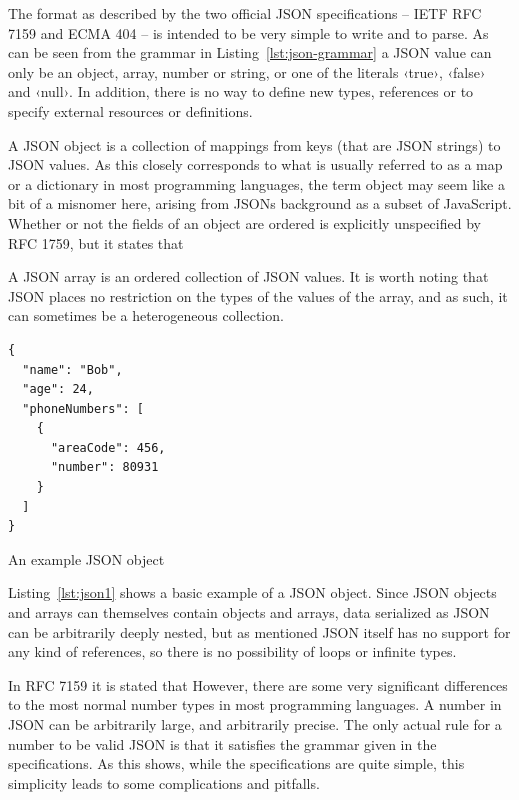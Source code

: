 The format as described by the two official JSON specifications -- IETF RFC 7159 \cite{RFC7159} and ECMA 404 \cite{ECMA404} -- is intended to be very simple to write and to parse. As can be seen from the grammar in Listing~\ref{lst:json-grammar} a JSON value can only be an object, array, number or string, or one of the literals ‹true›, ‹false› and ‹null›. In addition, there is no way to define new types, references or to specify external resources or definitions.

A JSON object is a collection of mappings from keys (that are JSON strings) to JSON values. As this closely corresponds to what is usually referred to as a map or a dictionary in most programming languages, the term object may seem like a bit of a misnomer here, arising from JSONs background as a subset of JavaScript. Whether or not the fields of an object are ordered is explicitly unspecified by RFC 1759, but it states  \cite[6]{RFC7159} that 

A JSON array is an ordered collection of JSON values. It is worth noting that JSON places no restriction on the types of the values of the array, and as such, it can sometimes be a heterogeneous collection.

\begin{listing}[ht!]
\begin{verbatim}
{
  "name": "Bob",
  "age": 24,
  "phoneNumbers": [
    {
      "areaCode": 456,
      "number": 80931
    }
  ]
}
\end{verbatim}
\caption{An example JSON object}
\label{lst:json1}
\end{listing}

Listing~\ref{lst:json1} shows a basic example of a JSON object. Since JSON objects and arrays can themselves contain objects and arrays, data serialized as JSON can be arbitrarily deeply nested, but as mentioned JSON itself has no support for any kind of references, so there is no possibility of loops or infinite types.

In RFC 7159 it is stated that  However, there are some very significant differences to the most normal number types in most programming languages. A number in JSON can be arbitrarily large, and arbitrarily precise. The only actual rule for a number to be valid JSON is that it satisfies the grammar given in the specifications. As this shows, while the specifications are quite simple, this simplicity leads to some complications and pitfalls.

